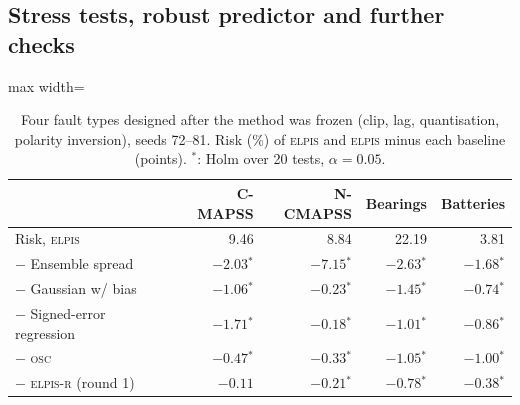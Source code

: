 \documentclass{esannV2}
\newcommand{\OSC}{\textsc{osc}}
\newcommand{\RPT}{\textsc{elpis}}
\newcommand{\Rone}{\textsc{elpis-r}}
\newcommand{\s}{$^{\ast}$}
\begin{document}
\subsection{Stress tests, robust predictor and further checks}
\begin{table}[!htbp]
\caption{Four fault types designed after the method was frozen (clip, lag, quantisation, polarity inversion), seeds 72--81. Risk (\%) of \RPT{} and \RPT{} minus each baseline (points). \s: Holm over 20 tests, $\alpha=0.05$.}
\label{tab:heldout}
\centering\footnotesize
\begin{adjustbox}{max width=\textwidth}\begin{tabular}{lrrrr}
\toprule
 & C-MAPSS & N-CMAPSS & Bearings & Batteries\\
\midrule
Risk, \RPT & 9.46 & 8.84 & 22.19 & 3.81\\
\midrule
$-$ Ensemble spread~\cite{lakshminarayanan2017simple} & $-2.03$\s & $-7.15$\s & $-2.63$\s & $-1.68$\s\\
$-$ Gaussian w/ bias~\cite{nix1994estimating} & $-1.06$\s & $-0.23$\s & $-1.45$\s & $-0.74$\s\\
$-$ Signed-error regression~\cite{yoo2019learning} & $-1.71$\s & $-0.18$\s & $-1.01$\s & $-0.86$\s\\
$-$ \OSC & $-0.47$\s & $-0.33$\s & $-1.05$\s & $-1.00$\s\\
$-$ \Rone{} (round 1) & $-0.11$ & $-0.21$\s & $-0.78$\s & $-0.38$\s\\
\bottomrule
\end{tabular}\end{adjustbox}
\end{table}
\end{document}
